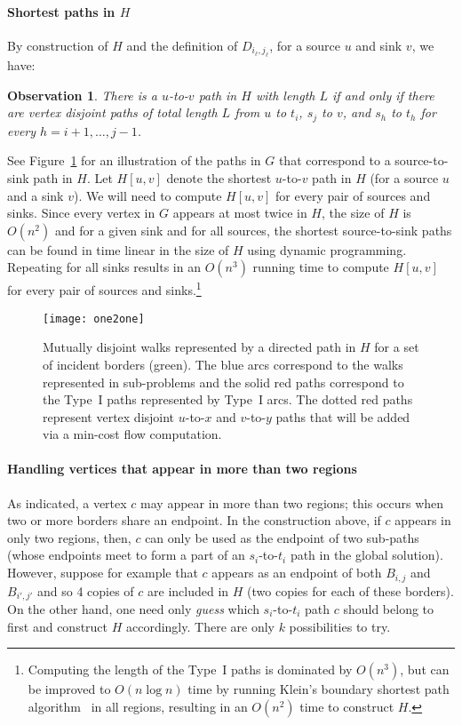 \documentclass[11pt,twoside]{article}
\newtheorem{observation}[theorem]{Observation}
\newcommand{\border}[2]{B_{#1,#2}}
\begin{document}
\paragraph{Shortest paths in $H$}
By construction of $H$ and the definition of $D_{i_\ell,j_\ell}$, for a source $u$ and sink $v$, we have:
\begin{observation}
  There is a $u$-to-$v$ path in $H$ with length $L$ if and only if there are vertex disjoint paths of total length $L$ from $u$ to $t_i$, $s_j$ to $v$, and $s_{h}$ to $t_{h}$ for every $h = i+1,
  \ldots, j-1$.
\end{observation}
See Figure~\ref{fig:one-to-one} for an illustration of the paths in $G$ that correspond to a source-to-sink path in $H$. Let $H[u,v]$ denote the shortest $u$-to-$v$ path in $H$ (for a source $u$ and a sink $v$).  We will need to compute $H[u,v]$ for every pair of sources and sinks.  Since every vertex in $G$ appears at most twice in $H$, the size of $H$ is $O(n^2)$ and for a given sink and for all sources, the shortest source-to-sink paths can be found in time linear in the size of $H$ using dynamic programming.  Repeating for all sinks results in an $O(n^3)$ running time to compute $H[u,v]$ for every pair of sources and sinks.\footnote{Computing the length of the Type~I paths is dominated by $O(n^3)$, but can be improved to $O(n\log n)$ time by running Klein's boundary shortest path algorithm~\cite{klein2005multiSourceShPaths} in all regions, resulting in an $O(n^2)$ time to construct $H$.}

\begin{figure}[ht]
  \centering
  \texttt{[image: one2one]}
  \caption{Mutually disjoint walks represented by a directed path in $H$ for a set of incident borders (green).  The blue arcs correspond to the walks represented in sub-problems and the solid red paths correspond to the Type~I paths represented by Type~I arcs.  The dotted red paths represent vertex disjoint $u$-to-$x$ and $v$-to-$y$ paths that will be added via a min-cost flow computation.}
\label{fig:one-to-one}
\end{figure}


\paragraph{Handling vertices that appear in more than two regions}  As indicated, a vertex $c$ may appear in more than two regions; this occurs when two or more borders share an endpoint.  In the construction above, if $c$ appears in only two regions, then, $c$ can only be used as the endpoint of two sub-paths (whose endpoints meet to form a part of an $s_i$-to-$t_i$ path in the global solution).  However, suppose for example that $c$ appears as an endpoint of both $\border{i}{j}$ and $\border{i'}{j'}$ and so 4 copies of $c$ are included in $H$ (two copies for each of these borders).  On the other hand, one need only {\em guess} which $s_i$-to-$t_i$ path $c$ should belong to first and construct $H$ accordingly.  There are only $k$ possibilities to try.
\end{document}
